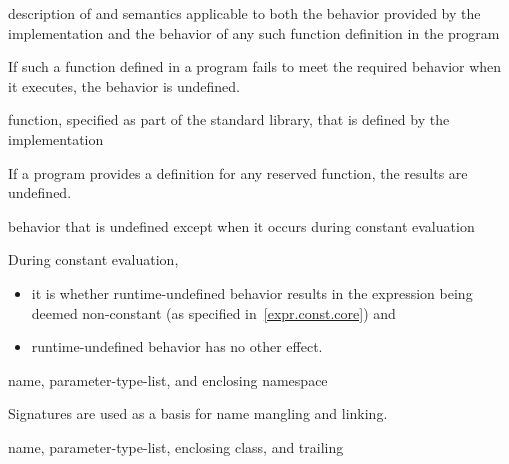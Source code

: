 %
description of 
and  semantics
applicable to both the behavior provided by the implementation and
the behavior of any such function definition in the program

\begin{defnote}
If such a function defined in a \Cpp{} program fails to meet the required
behavior when it executes, the behavior is undefined.%
\end{defnote}

%
function, specified as part of the \Cpp{} standard library, that is defined by the
implementation

\begin{defnote}
If a \Cpp{} program provides a definition for any reserved function, the results are undefined.%
\end{defnote}

%
behavior that is undefined except when it occurs during constant evaluation

\begin{defnote}
During constant evaluation,
\begin{itemize}
\item
it is
whether runtime-undefined behavior results in the expression being deemed non-constant
(as specified in~\ref{expr.const.core}) and
\item
runtime-undefined behavior has no other effect.
\end{itemize}
\end{defnote}

%
name,
parameter-type-list,
and enclosing namespace

\begin{defnote}
Signatures are used as a basis for
name mangling and linking.
\end{defnote}

%
name,
parameter-type-list,
enclosing class,
and
trailing 

